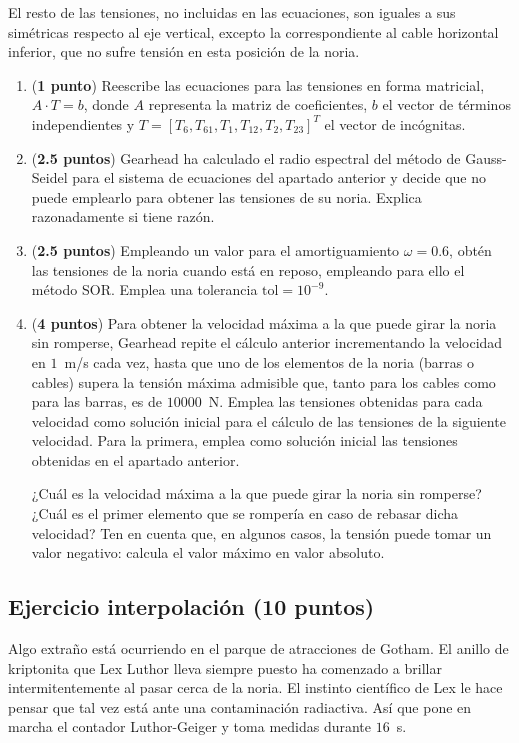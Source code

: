 El resto de las tensiones, no incluidas en las ecuaciones, son iguales a sus simétricas respecto al eje vertical, excepto la correspondiente al cable horizontal inferior, que no sufre tensión en esta posición de la noria.
\begin{enumerate}
	\item (\textbf{1 punto}) Reescribe las ecuaciones para las tensiones en forma matricial, $A\cdot T=b$,
	donde $A$ representa la matriz de coeficientes, $b$ el vector de términos independientes y $T = [T_6,T_{61},T_1,T_{12},T_2,T_{23}]^T$ el vector de incógnitas.

	\item (\textbf{2.5 puntos}) Gearhead ha calculado el radio espectral del método de Gauss-Seidel para el sistema de ecuaciones del apartado anterior y decide que no puede emplearlo para obtener las tensiones de su noria. Explica razonadamente si tiene razón.

	\item (\textbf{2.5 puntos}) Empleando un valor para el amortiguamiento $\omega = 0.6$, obtén las tensiones de la noria cuando está en reposo, empleando para ello el método SOR. Emplea una tolerancia $\text{tol}=10^{-9}$.

	\item (\textbf{4 puntos}) Para obtener la velocidad máxima a la que puede girar la noria sin romperse, Gearhead repite el cálculo anterior incrementando la velocidad en $1$~m/s cada vez, hasta que uno de los elementos de la noria (barras o cables) supera la tensión máxima admisible que, tanto para los cables como para las barras, es de $10000$~N. Emplea las tensiones obtenidas para cada velocidad como solución inicial para el cálculo de las tensiones de la siguiente velocidad. Para la primera, emplea como solución inicial las tensiones obtenidas en el apartado anterior.

	¿Cuál es la velocidad máxima a la que puede girar la noria sin romperse? ¿Cuál es el primer elemento que se rompería en caso de rebasar dicha velocidad? Ten en cuenta que, en algunos casos, la tensión puede tomar un valor negativo: calcula el valor máximo en valor absoluto.
\end{enumerate}

\subsection*{Ejercicio interpolación (10 puntos)}

Algo extraño está ocurriendo en el parque de atracciones de Gotham. El anillo de kriptonita que Lex Luthor lleva siempre puesto ha comenzado a brillar intermitentemente al pasar cerca de la noria. El instinto científico de Lex le hace pensar que tal vez está ante una contaminación radiactiva. Así que pone en marcha el contador Luthor-Geiger y toma medidas durante $16$~s.

